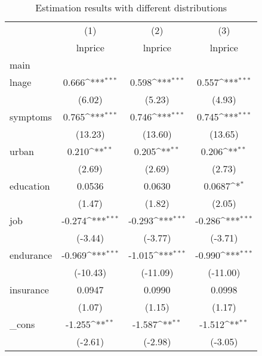 \begin{table}[htbp]\centering
\def\sym#1{\ifmmode^{#1}\else\(^{#1}\)\fi}
\caption{Estimation results with different distributions}
\begin{tabular}{l*{3}{c}}
\hline\hline
            &\multicolumn{1}{c}{(1)}&\multicolumn{1}{c}{(2)}&\multicolumn{1}{c}{(3)}\\
            &\multicolumn{1}{c}{lnprice}&\multicolumn{1}{c}{lnprice}&\multicolumn{1}{c}{lnprice}\\
\hline
main        &                     &                     &                     \\
lnage       &       0.666\sym{***}&       0.598\sym{***}&       0.557\sym{***}\\
            &      (6.02)         &      (5.23)         &      (4.93)         \\
[1em]
symptoms    &       0.765\sym{***}&       0.746\sym{***}&       0.745\sym{***}\\
            &     (13.23)         &     (13.60)         &     (13.65)         \\
[1em]
urban       &       0.210\sym{**} &       0.205\sym{**} &       0.206\sym{**} \\
            &      (2.69)         &      (2.69)         &      (2.73)         \\
[1em]
education   &      0.0536         &      0.0630         &      0.0687\sym{*}  \\
            &      (1.47)         &      (1.82)         &      (2.05)         \\
[1em]
job         &      -0.274\sym{***}&      -0.293\sym{***}&      -0.286\sym{***}\\
            &     (-3.44)         &     (-3.77)         &     (-3.71)         \\
[1em]
endurance   &      -0.969\sym{***}&      -1.015\sym{***}&      -0.990\sym{***}\\
            &    (-10.43)         &    (-11.09)         &    (-11.00)         \\
[1em]
insurance   &      0.0947         &      0.0990         &      0.0998         \\
            &      (1.07)         &      (1.15)         &      (1.17)         \\
[1em]
\_cons      &      -1.255\sym{**} &      -1.587\sym{**} &      -1.512\sym{**} \\
            &     (-2.61)         &     (-2.98)         &     (-3.05)         \\

\end{tabular}
\end{table}
